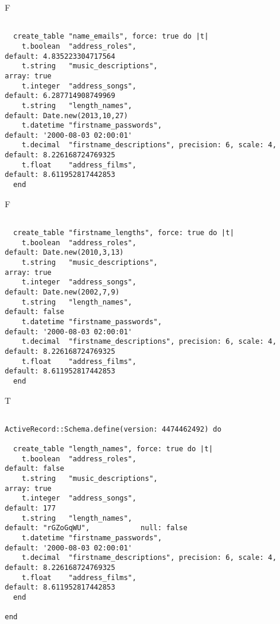 F
\begin{verbatim}

  create_table "name_emails", force: true do |t|
    t.boolean  "address_roles",                                  default: 4.835223304717564
    t.string   "music_descriptions",                                                                          array: true
    t.integer  "address_songs",                                  default: 6.287714908749969
    t.string   "length_names",                                   default: Date.new(2013,10,27)
    t.datetime "firstname_passwords",                            default: '2000-08-03 02:00:01'
    t.decimal  "firstname_descriptions", precision: 6, scale: 4, default: 8.226168724769325
    t.float    "address_films",                                  default: 8.611952817442853
  end

\end{verbatim}

F
\begin{verbatim}

  create_table "firstname_lengths", force: true do |t|
    t.boolean  "address_roles",                                  default: Date.new(2010,3,13)
    t.string   "music_descriptions",                                                                          array: true
    t.integer  "address_songs",                                  default: Date.new(2002,7,9)
    t.string   "length_names",                                   default: false
    t.datetime "firstname_passwords",                            default: '2000-08-03 02:00:01'
    t.decimal  "firstname_descriptions", precision: 6, scale: 4, default: 8.226168724769325
    t.float    "address_films",                                  default: 8.611952817442853
  end

\end{verbatim}

T
\begin{verbatim}

ActiveRecord::Schema.define(version: 4474462492) do

  create_table "length_names", force: true do |t|
    t.boolean  "address_roles",                                  default: false
    t.string   "music_descriptions",                                                                          array: true
    t.integer  "address_songs",                                  default: 177
    t.string   "length_names",                                   default: "rGZoGqWU",            null: false
    t.datetime "firstname_passwords",                            default: '2000-08-03 02:00:01'
    t.decimal  "firstname_descriptions", precision: 6, scale: 4, default: 8.226168724769325
    t.float    "address_films",                                  default: 8.611952817442853
  end

end
\end{verbatim}


